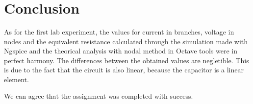 \section{Conclusion}
\label{sec:conclusion}
\paragraph{}
\par As for the first lab experiment, the values for current in branches, voltage in nodes and the equivalent resistance calculated through the simulation made with Ngspice and the theorical analysis with nodal method in Octave tools were in perfect harmony. The differences between the obtained values are negletible. This is due to the fact that the circuit is also linear, because the capacitor is a linear element. 
\par We can agree that the assignment was completed with success.      
